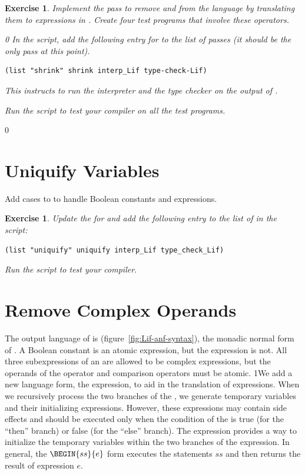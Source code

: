 \documentclass[7x10]{TimesAPriori_MIT}%
\def\racketEd{0}
\def\pythonEd{1}
\def\edition{1}
\newcommand{\pythonColor}[0]{}
\newcommand{\python}[1]{{\if\edition\pythonEd\pythonColor #1\fi}}
\newtheorem{exercise}[theorem]{Exercise}
\numberwithin{theorem}{chapter}
\numberwithin{definition}{chapter}
\numberwithin{equation}{chapter}
\begin{document}
\begin{exercise}\normalfont\normalsize
%
Implement the pass  to remove  and  from
the language by translating them to  expressions in \LangIf{}.
%
Create four test programs that involve these operators.
%
{\if\edition\racketEd    
In the  script, add the following entry for
 to the list of passes (it should be the only pass at
this point).
\begin{lstlisting}
(list "shrink" shrink interp_Lif type-check-Lif)
\end{lstlisting}
This instructs  to run the interpreter
 and the type checker  on the
output of .
\fi}
%
Run the script to test your compiler on all the test programs.
\end{exercise}

{\if\edition\racketEd    

\section{Uniquify Variables}
\label{sec:uniquify-Lif}

Add cases to  to handle Boolean constants and
 expressions.

\begin{exercise}\normalfont\normalsize
Update the  for \LangIf{} and add the following
entry to the list of  in the  script:
\begin{lstlisting}
(list "uniquify" uniquify interp_Lif type_check_Lif)
\end{lstlisting}
Run the script to test your compiler.
\end{exercise}

\fi}

\section{Remove Complex Operands}
\label{sec:remove-complex-opera-Lif}

The output language of  is
\LangIfANF{} (figure~\ref{fig:Lif-anf-syntax}), the monadic
normal form of \LangIf{}.  A Boolean constant is an atomic expression,
but the  expression is not.  All three subexpressions of an
 are allowed to be complex expressions, but the operands of
the  operator and comparison operators must be atomic.
%
\python{We add a new language form, the  expression, to aid
  in the translation of \code{if} expressions. When we recursively
  process the two branches of the \code{if}, we generate temporary
  variables and their initializing expressions. However, these
  expressions may contain side effects and should be executed only
  when the condition of the \code{if} is true (for the ``then''
  branch) or false (for the ``else'' branch). The \code{Begin} expression
  provides a way to initialize the temporary variables within the two branches
  of the \code{if} expression.  In general, the $\BEGIN{ss}{e}$
  form executes the statements $ss$ and then returns the result of
  expression $e$.}
\end{document}
